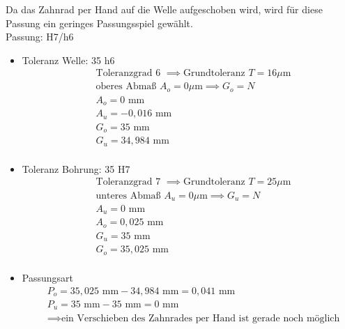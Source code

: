 Da das Zahnrad per Hand auf die Welle aufgeschoben wird, wird für diese Passung ein geringes Passungsspiel gewählt. \\ 
Passung: H7/h6
\begin{itemize}
	\item Toleranz Welle: 35 h6
	\begin{align*}
	&\text{Toleranzgrad 6 } \implies \text{Grundtoleranz } T=16 \mu\text{m} \\
	&\text{oberes Abmaß } A_o = 0\mu\text{m} \implies G_o = N\\
	&A_o = 0 \text{ mm} \\
	&A_u = -0,016 \text{ mm} \\
	&G_o = 35 \text{ mm} \\
	&G_u = 34,984 \text{ mm}\\
	\end{align*} 
	\item Toleranz Bohrung: 35 H7
	\begin{align*}
	&\text{Toleranzgrad 7 } \implies \text{Grundtoleranz } T=25 \mu\text{m} \\
	&\text{unteres Abmaß } A_u = 0 \mu\text{m} \implies G_u = N\\
	&A_u = 0 \text{ mm} \\
	&A_o = 0,025 \text{ mm} \\
	&G_u = 35 \text{ mm} \\
	&G_o = 35,025 \text{ mm}\\
	\end{align*} 
	\item Passungsart
	\begin{align*}
	&P_o = 35,025 \text{ mm} - 34,984 \text{ mm} = 0,041 \text{ mm} \\
	&P_u = 35 \text{ mm} - 35 \text{ mm} =0 \text{ mm}\\
	&\implies \text{ein Verschieben des Zahnrades per Hand ist gerade noch möglich}
	\end{align*} 
\end{itemize}


